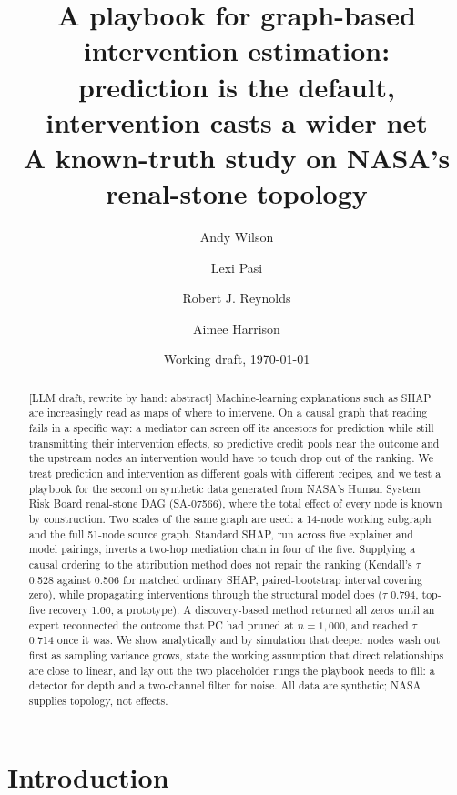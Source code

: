 \documentclass[11pt]{article}
\title{A playbook for graph-based intervention estimation:\\
prediction is the default, intervention casts a wider net\\
\large A known-truth study on NASA's renal-stone topology}
\author{Andy Wilson \and Lexi Pasi \and Robert J. Reynolds \and Aimee Harrison\\[4pt]
\normalsize\todo{author list and order unconfirmed; affiliations}}
\date{Working draft, \today}
\newcommand{\draftnote}[1]{\textcolor{blue!60!black}{[LLM draft, rewrite by hand: #1]}}
\begin{document}
\maketitle

\begin{abstract}
\draftnote{abstract}
Machine-learning explanations such as SHAP are increasingly read as maps of
where to intervene. On a causal graph that reading fails in a specific way:
a mediator can screen off its ancestors for prediction while still
transmitting their intervention effects, so predictive credit pools near the
outcome and the upstream nodes an intervention would have to touch drop out
of the ranking. We treat prediction and intervention as different goals with
different recipes, and we test a playbook for the second on synthetic data
generated from NASA's Human System Risk Board renal-stone DAG (SA-07566),
where the total effect of every node is known by construction. Two scales of
the same graph are used: a 14-node working subgraph and the full 51-node
source graph. Standard SHAP, run across five explainer and model pairings,
inverts a two-hop mediation chain in four of the five. Supplying a causal
ordering to the attribution method does not repair the ranking (Kendall's
$\tau$ 0.528 against 0.506 for matched ordinary SHAP, paired-bootstrap
interval covering zero), while propagating interventions through the
structural model does ($\tau$ 0.794, top-five recovery 1.00, a prototype).
A discovery-based method returned all zeros until an expert reconnected the
outcome that PC had pruned at $n=1{,}000$, and reached $\tau$ 0.714 once it
was. We show analytically and by simulation that deeper nodes wash out first
as sampling variance grows, state the working assumption that direct
relationships are close to linear, and lay out the two placeholder rungs the
playbook needs to fill: a detector for depth and a two-channel filter for
noise. All data are synthetic; NASA supplies topology, not effects.
\end{abstract}

\section{Introduction}
\end{document}
